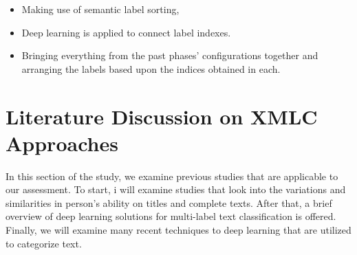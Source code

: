 \documentclass[a4paper]{article}
\begin{document}
\begin{itemize}
    \item Making use of semantic label sorting,
    \item Deep learning is applied to connect label indexes.
    \item Bringing everything from the past phases' configurations together and arranging the labels based upon the indices obtained in each.
\end{itemize}

\section{Literature Discussion on XMLC Approaches}

In this section of the study, we examine previous studies that are applicable to our assessment. To start, i will examine studies that look into the variations and similarities in person's ability on titles and complete texts. After that, a brief overview of deep learning solutions for multi-label text classification is offered. Finally, we will examine many recent techniques to deep learning that are utilized to categorize text.
\end{document}
